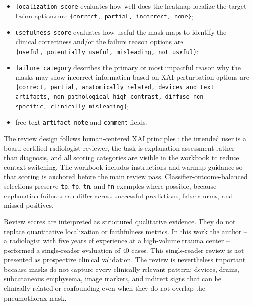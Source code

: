 \begin{itemize}
	\tightlist
	\item
	\texttt{localization \allowbreak score} 
	\subitem
	evaluates how well does the heatmap localize the target lesion
	\subitem options are \texttt{\{correct,\allowbreak \ partial,\allowbreak \ incorrect,\allowbreak \ none\}};
	\item
	\texttt{usefulness \allowbreak score} 
	\subitem 
	evaluates how useful the mask maps to identify the clinical correctness and/or the failure reason
	\subitem options are \texttt{\{useful,\allowbreak \ potentially \allowbreak useful,\allowbreak \ misleading,\allowbreak \ not \allowbreak useful\}};
	\item
	\texttt{failure \allowbreak category} 
	\subitem
	describes the primary or most impactful reason why the masks may show incorrect information based on XAI perturbation
	\subitem options are \texttt{\{correct,\allowbreak \ partial,\allowbreak \ anatomically \allowbreak related,\allowbreak \ devices \allowbreak and text \allowbreak artifacts,\allowbreak \ non \allowbreak pathological \allowbreak high \allowbreak contrast,\allowbreak \ diffuse \allowbreak non \allowbreak specific,\allowbreak \ clinically \allowbreak misleading\}};
	\item
	free-text \texttt{artifact \allowbreak note} and \texttt{comment} fields.
\end{itemize}

The review design follows human-centered XAI principles
\cite{ref-human-centered-xai}: the intended user is a board-certified radiologist
reviewer, the task is explanation assessment rather than diagnosis, and
all scoring categories are visible in the workbook to reduce context
switching. The workbook includes instructions and warmup guidance so
that scoring is anchored before the main review pass.
Classifier-outcome-balanced selections preserve \texttt{tp},
\texttt{fp}, \texttt{tn}, and \texttt{fn} examples where possible,
because explanation failures can differ across successful predictions,
false alarms, and missed positives.

Review scores are interpreted as structured qualitative evidence. They
do not replace quantitative localization or faithfulness metrics.
In this work the author -- a radiologist with five years of
experience at a high-volume trauma center -- performed a single-reader
evaluation of 40 cases. This single-reader review is not presented 
as prospective clinical 
validation. The review is nevertheless important because masks do not
capture every clinically relevant pattern: devices, drains, subcutaneous
emphysema, image markers, and indirect signs that can be clinically related
or confounding even when they do not overlap the pneumothorax mask.

